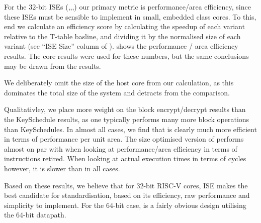 For the $32$-bit ISEs 
(,,,)
our primary metric is
performance/area efficiency, since these ISEs must be sensible to
implement in small, embedded class cores.
To this, end we calculate an efficiency score by calculating the speedup
of each variant relative to the T-table basline, and dividing it
by the normalised size of each variant
(see ``ISE Size'' column of ).
 shows the performance / area efficiency results.
The  core results were used for these numbers, but the
same conclusions may be drawn from the  results.

We deliberately omit the size of the host core from our calculation,
as this dominates the total size of the system and detracts from
the comparison.

Qualitativley, we place more weight on the block encrypt/decrypt results
than the KeySchedule results, as one typically performs many more
block operations than KeySchedules.
In almost all cases, we find that  is clearly much more
efficient in terms of performance per unit area.
The size optimised version of  performs almost on par with
 when looking at performance/area efficiency in terms of
instructions retired.
When looking at actual execution times in terms of cycles however,
it is slower than  in all cases.

Based on these results, we believe that for $32$-bit RISC-V cores,
ISE  makes the best candidate for standardisation,
based on its efficiency, raw performance and simplicity to implement.
For the $64$-bit case,  is a fairly obvious design utilising
the $64$-bit datapath.

